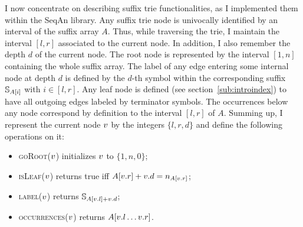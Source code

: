I now concentrate on describing suffix trie functionalities, as I implemented them within the SeqAn library.
Any suffix trie node is univocally identified by an interval of the suffix array $A$.
Thus, while traversing the trie, I maintain the interval $[l,r]$ associated to the current node.
In addition, I also remember the depth $d$ of the current node.
The root node is represented by the interval $[1,n]$ containing the whole suffix array.
The label of any edge entering some internal node at depth $d$ is defined by the $d$-th symbol within the corresponding suffix $\mathbb{S}_{A[i]}$ with $i \in [l,r]$.
Any leaf node is defined (see section~\ref{sub:introindex}) to have all outgoing edges labeled by terminator symbols.
The occurrences below any node correspond by definition to the interval $[l,r]$ of $A$.
Summing up, I represent the current node $v$ by the integers $\{ l, r ,d \}$ and define the following operations on it:
\begin{itemize}
\item \textsc{goRoot}($v$) initializes $v$ to $\{ 1, n, 0\}$;
\item \textsc{isLeaf}($v$) returns true iff $A[v.r] + v.d = n_{A[v.r]}$;
\item \textsc{label}($v$) returns $\mathbb{S}_{A[v.l] + v.d}$;
\item \textsc{occurrences}($v$) returns $A[v.l \dots v.r]$.
\end{itemize}

